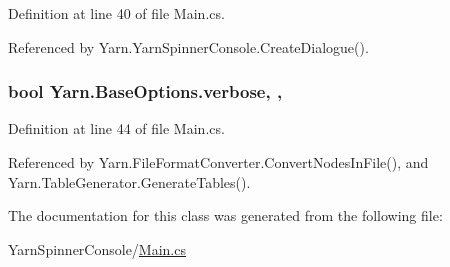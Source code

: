 Definition at line 40 of file Main.\-cs.



Referenced by Yarn.\-Yarn\-Spinner\-Console.\-Create\-Dialogue().

\hypertarget{a00035_ada4d83d1756918f362d55f6649b82b17}{
\subsubsection[{verbose}]{\setlength{\rightskip}{0pt plus 5cm}bool Yarn.\-Base\-Options.\-verbose\hspace{0.3cm}{\ttfamily [get]}, {\ttfamily [set]}, {\ttfamily [inherited]}}}\label{a00035_ada4d83d1756918f362d55f6649b82b17}


Definition at line 44 of file Main.\-cs.



Referenced by Yarn.\-File\-Format\-Converter.\-Convert\-Nodes\-In\-File(), and Yarn.\-Table\-Generator.\-Generate\-Tables().



The documentation for this class was generated from the following file\-:\begin{DoxyCompactItemize}
\item 
Yarn\-Spinner\-Console/\hyperlink{a00313}{Main.\-cs}\end{DoxyCompactItemize}

